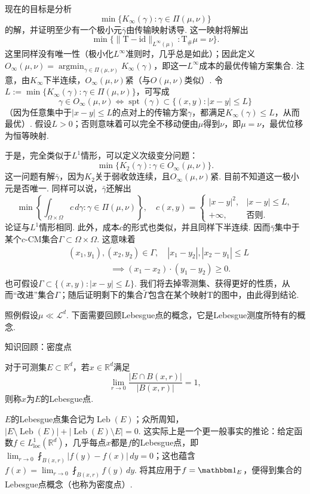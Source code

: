 现在的目标是分析
\[
\min\{K_\infty(\gamma):\gamma\in\Pi(\mu,\nu)\}
\]
的解，并证明至少有一个极小元$\bar\gamma$由传输映射诱导. 这一映射将解出
\[
\min\{\|\mathrm T-\mathrm{id}\|_{L^\infty(\mu)}:\mathrm T_\#\mu=\nu\}.
\]
这里同样没有唯一性（极小化$L^\infty$准则时，几乎总是如此）；因此定义$O_\infty(\mu,\nu)=\operatorname*{argmin}_{\gamma\in\Pi(\mu,\nu)}K_\infty(\gamma)$，即这一$L^\infty$成本的最优传输方案集合. 注意，由$K_\infty$下半连续，$O_\infty(\mu,\nu)$紧（与$O(\mu,\nu)$类似）. 令$L:=\min\{K_\infty(\gamma):\gamma\in\Pi(\mu,\nu)\}$，可写成
\[
\gamma\in O_\infty(\mu,\nu)\iff\operatorname{spt}(\gamma)\subset\{(x,y):|x-y|\le L\}
\]
（因为任意集中于$|x-y|\le L$的点对上的传输方案$\gamma$，都满足$K_\infty(\gamma)\le L$，从而最优）. 假设$L>0$；否则意味着可以完全不移动便由$\mu$得到$\nu$，即$\mu=\nu$，最优位移为恒等映射.

于是，完全类似于$L^1$情形，可以定义次级变分问题：
\[
\min\{K_2(\gamma):\gamma\in O_\infty(\mu,\nu)\}.
\]
这一问题有解$\bar\gamma$，因为$K_2$关于弱收敛连续，且$O_\infty(\mu,\nu)$紧. 目前不知道这一极小元是否唯一. 同样可以说，$\bar\gamma$还解出
\begin{equation*}
\min\left\{\int_{\Omega\times\Omega}c\,d\gamma:\gamma\in\Pi(\mu,\nu)\right\},\quad
c(x,y)=\begin{cases}|x-y|^2,&|x-y|\le L,\\+\infty,&\text{否则}.\end{cases}
\end{equation*}
论证与$L^1$情形相同. 此外，成本$c$的形式也类似，并且同样下半连续. 因而$\bar\gamma$集中于某个$c$-CM集合$\Gamma\subset\Omega\times\Omega$. 这意味着
\begin{equation}\label{eq:3.5}
\begin{aligned}
&(x_1,y_1),(x_2,y_2)\in\Gamma,\quad |x_1-y_2|,|x_2-y_1|\le L\\
&\hspace{5em}\implies(x_1-x_2)\cdot(y_1-y_2)\ge0.
\end{aligned}
\end{equation}
也可假设$\Gamma\subset\{(x,y):|x-y|\le L\}$. 我们将去掉零测集、获得更好的性质，从而“改进”集合$\Gamma$；随后证明剩下的集合$\widetilde\Gamma$包含在某个映射$\mathrm T$的图中，由此得到结论.

照例假设$\mu\ll\mathscr L^d$. 下面需要回顾Lebesgue点的概念，它是Lebesgue测度所特有的概念.
\begin{sourcebox}{知识回顾：密度点}\label{box:3.2}
\begin{definition*}
对于可测集$E\subset\mathbb R^d$，若$x\in\mathbb R^d$满足
\[
\lim_{r\to0}\frac{|E\cap B(x,r)|}{|B(x,r)|}=1,
\]
则称$x$为$E$的Lebesgue点.
\end{definition*}
$E$的Lebesgue点集合记为$\operatorname{Leb}(E)$；众所周知，$|E\setminus\operatorname{Leb}(E)|+|\operatorname{Leb}(E)\setminus E|=0$. 这实际上是一个更一般事实的推论：给定函数$f\in L^1_{\mathrm{loc}}(\mathbb R^d)$，几乎每点$x$都是$f$的Lebesgue点，即$\lim_{r\to0}\fint_{B(x,r)}|f(y)-f(x)|\,dy=0$；这也蕴含$f(x)=\lim_{r\to0}\fint_{B(x,r)}f(y)\,dy$. 将其应用于$f=\mathbbm1_E$，便得到集合的Lebesgue点概念（也称为密度点）.
\end{sourcebox}

